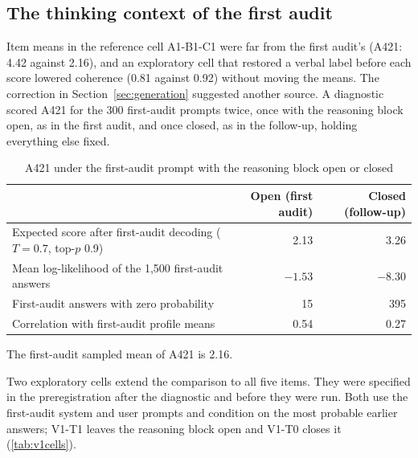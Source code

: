 \documentclass[11pt]{article}
\begin{document}
\subsection{The thinking context of the first audit}

Item means in the reference cell A1-B1-C1 were far from the first audit's (A421: 4.42 against 2.16), and an exploratory cell that restored a verbal label before each score lowered coherence (0.81 against 0.92) without moving the means. The correction in Section~\ref{sec:generation} suggested another source. A diagnostic scored A421 for the 300 first-audit prompts twice, once with the reasoning block open, as in the first audit, and once closed, as in the follow-up, holding everything else fixed.

\begin{table}[H]
\centering
\caption{A421 under the first-audit prompt with the reasoning block open or closed}
\label{tab:think}
\small
\begin{tabular}{lrr}
\toprule
 & Open (first audit) & Closed (follow-up) \\
\midrule
Expected score after first-audit decoding ($T=0.7$, top-$p$ 0.9) & 2.13 & 3.26 \\
Mean log-likelihood of the 1,500 first-audit answers & $-1.53$ & $-8.30$ \\
First-audit answers with zero probability & 15 & 395 \\
Correlation with first-audit profile means & 0.54 & 0.27 \\
\bottomrule
\end{tabular}
\begin{tablenotes}\footnotesize
\item The first-audit sampled mean of A421 is 2.16.
\end{tablenotes}
\end{table}

Two exploratory cells extend the comparison to all five items. They were specified in the preregistration after the diagnostic and before they were run. Both use the first-audit system and user prompts and condition on the most probable earlier answers; V1-T1 leaves the reasoning block open and V1-T0 closes it (\cref{tab:v1cells}).
\end{document}
